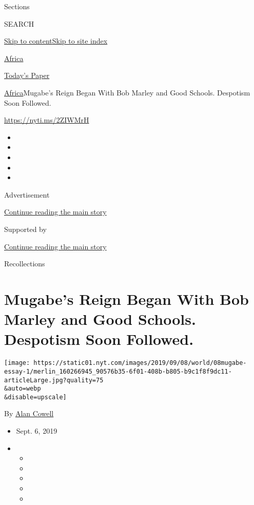 Sections

SEARCH

\protect\hyperlink{site-content}{Skip to
content}\protect\hyperlink{site-index}{Skip to site index}

\href{https://www.nytimes.com/section/world/africa}{Africa}

\href{https://myaccount.nytimes.com/auth/login?response_type=cookie\&client_id=vi}{}

\href{https://www.nytimes.com/section/todayspaper}{Today's Paper}

\href{/section/world/africa}{Africa}\textbar{}Mugabe's Reign Began With
Bob Marley and Good Schools. Despotism Soon Followed.

\url{https://nyti.ms/2ZIWMrH}

\begin{itemize}
\item
\item
\item
\item
\item
\end{itemize}

Advertisement

\protect\hyperlink{after-top}{Continue reading the main story}

Supported by

\protect\hyperlink{after-sponsor}{Continue reading the main story}

Recollections

\hypertarget{mugabes-reign-began-with-bob-marley-and-good-schools-despotism-soon-followed}{%
\section{Mugabe's Reign Began With Bob Marley and Good Schools.
Despotism Soon
Followed.}\label{mugabes-reign-began-with-bob-marley-and-good-schools-despotism-soon-followed}}

\texttt{[image: https://static01.nyt.com/images/2019/09/08/world/08mugabe-essay-1/merlin\_160266945\_90576b35-6f01-408b-b805-b9c1f8f9dc11-articleLarge.jpg?quality=75\\\&auto=webp\\\&disable=upscale]}

By \href{https://www.nytimes.com/by/alan-cowell}{Alan Cowell}

\begin{itemize}
\item
  Sept. 6, 2019
\item
  \begin{itemize}
  \item
  \item
  \item
  \item
  \item
  \end{itemize}
\end{itemize}

